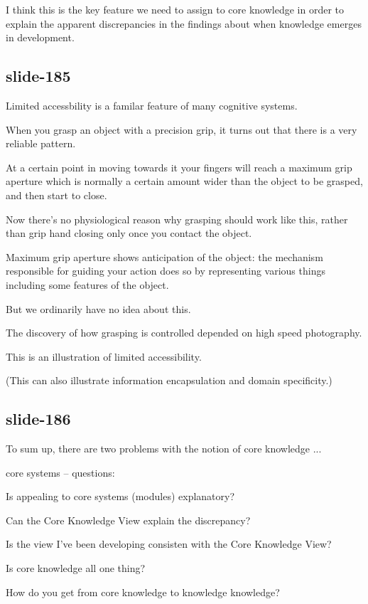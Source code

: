 \documentclass[12pt,\papersize]{extarticle}
\begin{document}
I think this is the key feature we need to assign to core knowledge in order to explain the apparent discrepancies in the findings about when knowledge emerges in development.
 
\subsection{slide-185}
Limited accessbility is a familar feature of many cognitive systems.
 
When you grasp an object with a precision grip, it turns out that there is a very reliable pattern.
 
At a certain point in moving towards it your fingers will reach a maximum grip aperture which is normally a certain amount wider than the object to be grasped, and then start to close.
 
Now there's no physiological reason why grasping should work like this, rather than grip hand closing only once you contact the object.
 
Maximum grip aperture shows anticipation of the object: the mechanism responsible for guiding your action does so by representing various things including some features of the object.
 
But we ordinarily have no idea about this.
 
The discovery of how grasping is controlled depended on high speed photography.
 
This is an illustration of limited accessibility.
 
(This can also illustrate information encapsulation and domain specificity.)
 
\subsection{slide-186}
To sum up, there are two problems with the notion of core knowledge ...
 
core systems -- questions:


          

            
Is appealing to core systems (modules) explanatory?

            
Can the Core Knowledge View explain the discrepancy?

            
Is the view I've been developing consisten with the Core Knowledge View?

            
Is core knowledge all one thing?

            
How do you get from core knowledge to knowledge knowledge?
\end{document}
